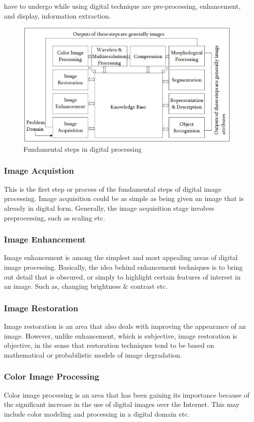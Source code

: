         have to undergo while using digital technique are pre-processing, enhancement, and display, information extraction.
        \begin{figure}[H]
            \centering
            \includegraphics[width=0.6\linewidth]{img/IP.jpg}
            \caption{Fundamental steps in digital processing}
        \end{figure}
        \subsubsection{Image Acquistion}
            This is the first step or process of the fundamental steps of digital image processing. Image acquisition could 
            be as simple as being given an image that is already in digital form. Generally, the image acquisition stage involves 
            preprocessing, such as scaling etc.
        \subsubsection{Image Enhancement}
            Image enhancement is among the simplest and most appealing areas of digital image processing. Basically, the idea behind 
            enhancement techniques is to bring out detail that is obscured, or simply to highlight certain features of interest in an 
            image. Such as, changing brightness \& contrast etc.
        \subsubsection{Image Restoration}
            Image restoration is an area that also deals with improving the appearance of an image. However, unlike enhancement, 
            which is subjective, image restoration is objective, in the sense that restoration techniques tend to be based on mathematical 
            or probabilistic models of image degradation.
        \subsubsection{Color Image Processing}
            Color image processing is an area that has been gaining its importance because of the significant increase in the use of digital 
            images over the Internet. This may include color modeling and processing in a digital domain etc.
